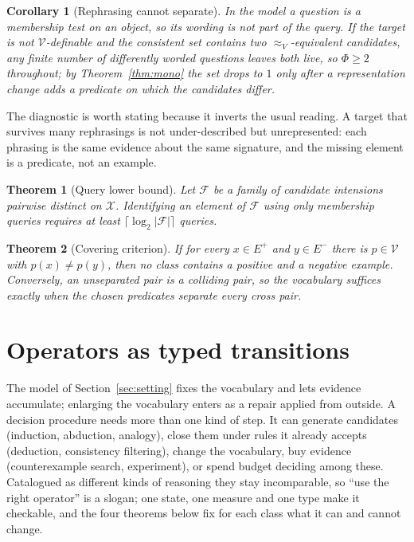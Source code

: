 \documentclass[11pt]{article}
\newtheorem{theorem}{Theorem}
\newtheorem{corollary}{Corollary}
\newcommand{\Indist}{\approx_{V}}
\newcommand{\Vocab}{\mathcal{V}}
\newcommand{\dom}{\mathcal{X}}
\newcommand{\Epos}{E^{+}}
\newcommand{\Eneg}{E^{-}}
\begin{document}
\begin{corollary}[Rephrasing cannot separate]\label{cor:rephrase}
In the model a question is a membership test on an object, so its wording is not part of the query.
If the target is not $\Vocab$-definable and the consistent set contains two $\Indist$-equivalent
candidates, any finite number of differently worded questions leaves both live, so $\Phi \ge 2$
throughout; by Theorem~\ref{thm:mono} the set drops to $1$ only after a representation change adds a
predicate on which the candidates differ.
\end{corollary}

The diagnostic is worth stating because it inverts the usual reading. A target that survives many
rephrasings is not under-described but unrepresented: each phrasing is the same evidence about the same
signature, and the missing element is a predicate, not an example.
\begin{theorem}[Query lower bound]\label{thm:lower}
Let $\mathcal{F}$ be a family of candidate intensions pairwise distinct on $\dom$. Identifying
an element of $\mathcal{F}$ using only membership queries requires at least
$\lceil \log_2 |\mathcal{F}| \rceil$ queries.
\end{theorem}

\begin{theorem}[Covering criterion]\label{thm:cover}
If for every $x \in \Epos$ and $y \in \Eneg$ there is $p \in \Vocab$ with $p(x) \neq p(y)$, then no
class contains a positive and a negative example. Conversely, an unseparated pair is a colliding
pair, so the vocabulary suffices exactly when the chosen predicates separate every cross pair.
\end{theorem}

\section{Operators as typed transitions}\label{sec:operators}

The model of Section~\ref{sec:setting} fixes the vocabulary and lets evidence accumulate; enlarging the
vocabulary enters as a repair applied from outside. A decision procedure needs more than one kind of
step. It can generate candidates (induction, abduction, analogy), close them under rules it already
accepts (deduction, consistency filtering), change the vocabulary, buy evidence (counterexample
search, experiment), or spend budget deciding among these. Catalogued as different kinds of reasoning
they stay incomparable, so ``use the right operator'' is a slogan; one state, one measure and one type
make it checkable, and the four theorems below fix for each class what it can and cannot change.
\end{document}
